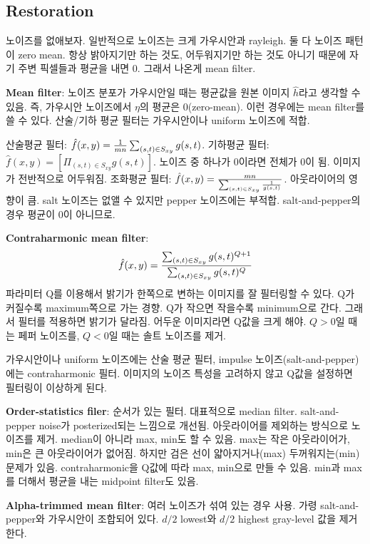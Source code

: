 \subsection{Restoration}

노이즈를 없애보자. 일반적으로 노이즈는 크게 가우시안과 rayleigh. 둘 다 노이즈 패턴이 zero mean. 항상 밝아지기만 하는 것도, 어두워지기만 하는 것도 아니기 때문에 자기 주변 픽셀들과 평균을 내면 0. 그래서 나온게 mean filter.

\textbf{Mean filter}: 노이즈 분포가 가우시안일 때는 평균값을 원본 이미지 $\hat{h}$라고 생각할 수 있음. 즉, 가우시안 노이즈에서 $\eta$의 평균은 0(zero-mean). 이런 경우에는 mean filter를 쓸 수 있다. 산술/기하 평균 필터는 가우시안이나 uniform 노이즈에 적합.

\bitmz
  \itm 산술평균 필터: $\hat{f}(x, y) = {1 \over mn} \sum_{(s, t) \in S_{xy}} g(s, t)$.
  \itm 기하평균 필터: $\hat{f}(x, y) = [\Pi_{(s, t) \in S_{xy}} g(s, t)]$. 노이즈 중 하나가 0이라면 전체가 0이 됨. 이미지가 전반적으로 어두워짐.
  \itm 조화평균 필터: $\hat{f}(x, y) = {mn \over \sum_{(s, t) \in S_{xy}} {1 \over g(s, t)}}$. 아웃라이어의 영향이 큼. salt 노이즈는 없앨 수 있지만 pepper 노이즈에는 부적합. salt-and-pepper의 경우 평균이 0이 아니므로.
\eitmz

\textbf{Contraharmonic mean filter}:
$$\hat{f}(x, y) = {\sum_{(s, t) \in S_{xy}} g(s, t)^{Q + 1} \over \sum_{(s, t) \in S_{xy}} {g(s, t)^Q}}$$
파라미터 Q를 이용해서 밝기가 한쪽으로 변하는 이미지를 잘 필터링할 수 있다. Q가 커질수록 maximum쪽으로 가는 경향. Q가 작으면 작을수록 minimum으로 간다. 그래서 필터를 적용하면 밝기가 달라짐. 어두운 이미지라면 Q값을 크게 해야. $Q > 0$일 때는 페퍼 노이즈를, $Q < 0$일 때는 솔트 노이즈를 제거.

가우시안이나 uniform 노이즈에는 산술 평균 필터, impulse 노이즈(salt-and-pepper)에는 contraharmonic 필터. 이미지의 노이즈 특성을 고려하지 않고 Q값을 설정하면 필터링이 이상하게 된다.

\textbf{Order-statistics filer}: 순서가 있는 필터. 대표적으로 median filter. salt-and-pepper noise가 posterized되는 느낌으로 개선됨. 아웃라이어를 제외하는 방식으로 노이즈를 제거. median이 아니라 max, min도 할 수 있음. max는 작은 아웃라이어가, min은 큰 아웃라이어가 없어짐. 하지만 검은 선이 얇아지거나(max) 두꺼워지는(min) 문제가 있음. contraharmonic을 Q값에 따라 max, min으로 만들 수 있음. min과 max를 더해서 평균을 내는 midpoint filter도 있음.

\textbf{Alpha-trimmed mean filter}: 여러 노이즈가 섞여 있는 경우 사용. 가령 salt-and-pepper와 가우시안이 조합되어 있다. $d/2$ lowest와 $d/2$ highest gray-level 값을 제거한다.

